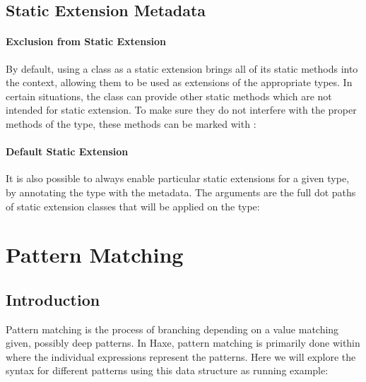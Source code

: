 

\subsection{Static Extension Metadata}
\label{lf-static-extension-metadata}

\paragraph{Exclusion from Static Extension}

By default, using a class as a static extension brings all of its static methods into the context, allowing them to be used as extensions of the appropriate types. In certain situations, the class can provide other static methods which are not intended for static extension. To make sure they do not interfere with the proper methods of the type, these methods can be marked with :


\paragraph{Default Static Extension}

It is also possible to always enable particular static extensions for a given type, by annotating the type with the  metadata. The arguments are the full dot paths of static extension classes that will be applied on the type:



\section{Pattern Matching}
\label{lf-pattern-matching}

\subsection{Introduction}
\label{lf-pattern-matching-introduction}

Pattern matching is the process of branching depending on a value matching given, possibly deep patterns. In Haxe, pattern matching is primarily done within  where the individual  expressions represent the patterns. Here we will explore the syntax for different patterns using this data structure as running example:

